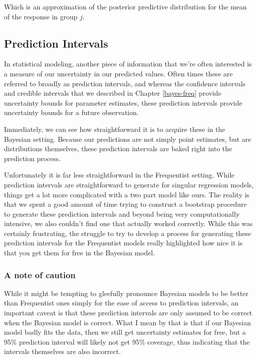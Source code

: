 \documentclass[12pt,twoside]{reedthesis}
\begin{document}
Which is an approximation of the posterior predictive distribution for the mean of the response in group \(j\).

\hypertarget{wraptwo}{%
\subsection{Prediction Intervals}\label{wraptwo}}

In statistical modeling, another piece of information that we're often interested is a measure of our uncertainty in our predicted values. Often times these are referred to broadly as prediction intervals, and whereas the confidence intervals and credible intervals that we described in Chapter \ref{bayes-freq} provide uncertainty bounds for parameter estimates, these prediction intervals provide uncertainty bounds for a future observation.

Immediately, we can see how straightforward it is to acquire these in the Bayesian setting. Because our predictions are not simply point estimates, but are distributions themselves, these prediction intervals are baked right into the prediction process.

Unfortunately it is far less straightforward in the Frequentist setting. While prediction intervals are straightforward to generate for singular regression models, things get a lot more complicated with a two part model like ours. The reality is that we spent a good amount of time trying to construct a bootstrap procedure to generate these prediction intervals and beyond being very computationally intensive, we also couldn't find one that actually worked correctly. While this was certainly frustrating, the struggle to try to develop a process for generating these prediction intervals for the Frequentist models really highlighted how nice it is that you get them for free in the Bayesian model.

\hypertarget{a-note-of-caution}{%
\subsubsection{A note of caution}\label{a-note-of-caution}}

While it might be tempting to gleefully pronounce Bayesian models to be better than Frequentist ones simply for the ease of access to prediction intervals, an important caveat is that these prediction intervals are only assumed to be correct when the Bayesian model is correct. What I mean by that is that if our Bayesian model badly fits the data, then we still get uncertainty estimates for free, but a 95\% prediction interval will likely not get 95\% coverage, thus indicating that the intervals themselves are also incorrect.
\end{document}
